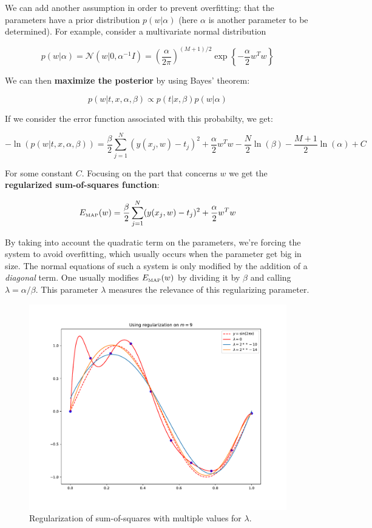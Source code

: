 \documentclass{report}
\begin{document}
We can add another assumption in order to prevent overfitting: that the parameters have a prior distribution $p(w|\alpha)$ (here $\alpha$ is another parameter to be determined). For example, consider a multivariate normal distribution

\[p(w|\alpha) = \mathcal{N}(w|0, \alpha^{-1}I) = \left(\frac{\alpha}{2\pi}\right)^{(M+1)/2}\exp\left\{-\frac{\alpha}{2}w^Tw\right\}\]

We can then \textbf{maximize the posterior} by using Bayes' theorem:

\[p(w|t, x, \alpha, \beta) \propto p(t|x,\beta)p(w|\alpha)\]

If we consider the error function associated with this probabilty, we get: 

\[-\ln(p(w|t,x,\alpha,\beta)) = \frac{\beta}{2}\sum_{j=1}^N(y(x_j, w) - t_j)^2 + \frac{\alpha}{2}w^Tw - \frac{N}{2}\ln(\beta) - \frac{M+1}{2}\ln(\alpha) + C\]

For some constant $C$. Focusing on the part that concerns $w$ we get the \textbf{regularized sum-of-squares function}:

\[E_{\tiny\mbox{MAP}}(w) = \frac{\beta}{2}\sum_{j=1}^N(y(x_j, w) - t_j)^2 + \frac{\alpha}{2}w^Tw\]

By taking into account the quadratic term on the parameters, we're forcing the system to avoid overfitting, which usually occurs when the parameter get big in size. The normal equations of such a system is only modified by the addition of a \textit{diagonal} term. One usually modifies $E_{\tiny\mbox{MAP}}(w)$ by dividing it by $\beta$ and calling $\lambda = \alpha/\beta$. This parameter $\lambda$ measures the relevance of this regularizing parameter.

\begin{figure}[H]
	\centering
	\includegraphics[width=1\textwidth]{images/regularization.pdf}
	\caption{Regularization of sum-of-squares with multiple values for $\lambda$.}
\end{figure}
\end{document}
